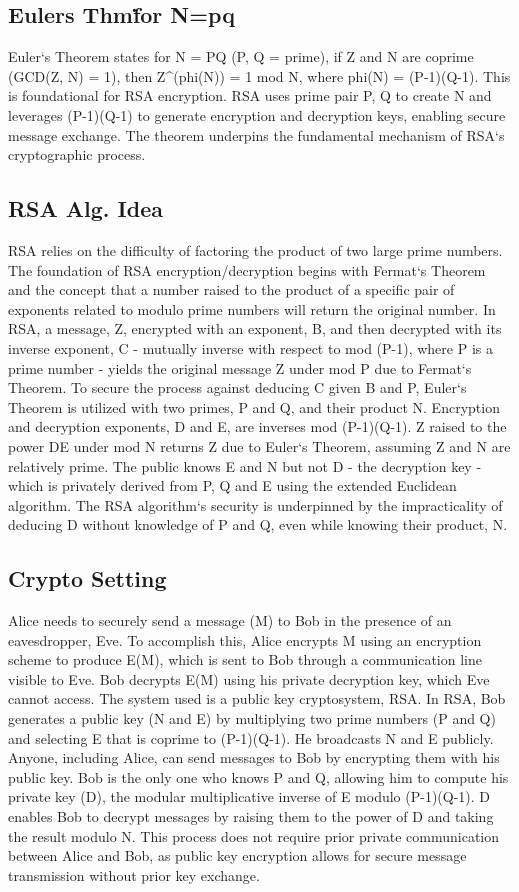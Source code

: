 \subsection*{Eulers Thm\. for N=pq}
Euler`s Theorem states for N = PQ (P, Q = prime), if Z and N are coprime (GCD(Z, N) = 1), then Z\textasciicircum{}(phi(N)) = 1 mod N, where phi(N) = (P-1)(Q-1).
This is foundational for RSA encryption.
RSA uses prime pair P, Q to create N and leverages (P-1)(Q-1) to generate encryption and decryption keys, enabling secure message exchange.
The theorem underpins the fundamental mechanism of RSA`s cryptographic process.

\subsection*{RSA Alg.
Idea}
RSA relies on the difficulty of factoring the product of two large prime numbers.
The foundation of RSA encryption/decryption begins with Fermat`s Theorem and the concept that a number raised to the product of a specific pair of exponents related to modulo prime numbers will return the original number.
In RSA, a message, Z, encrypted with an exponent, B, and then decrypted with its inverse exponent, C - mutually inverse with respect to mod (P-1), where P is a prime number - yields the original message Z under mod P due to Fermat`s Theorem.
To secure the process against deducing C given B and P, Euler`s Theorem is utilized with two primes, P and Q, and their product N\@.
Encryption and decryption exponents, D and E, are inverses mod (P-1)(Q-1).
Z raised to the power DE under mod N returns Z due to Euler`s Theorem, assuming Z and N are relatively prime.
The public knows E and N but not D - the decryption key - which is privately derived from P, Q and E using the extended Euclidean algorithm.
The RSA algorithm`s security is underpinned by the impracticality of deducing D without knowledge of P and Q, even while knowing their product, N\@.

\subsection*{Crypto Setting}
Alice needs to securely send a message (M) to Bob in the presence of an eavesdropper, Eve.
To accomplish this, Alice encrypts M using an encryption scheme to produce E(M), which is sent to Bob through a communication line visible to Eve.
Bob decrypts E(M) using his private decryption key, which Eve cannot access.
The system used is a public key cryptosystem, RSA\@.
In RSA, Bob generates a public key (N and E) by multiplying two prime numbers (P and Q) and selecting E that is coprime to (P-1)(Q-1).
He broadcasts N and E publicly.
Anyone, including Alice, can send messages to Bob by encrypting them with his public key.
Bob is the only one who knows P and Q, allowing him to compute his private key (D), the modular multiplicative inverse of E modulo (P-1)(Q-1).
D enables Bob to decrypt messages by raising them to the power of D and taking the result modulo N\@.
This process does not require prior private communication between Alice and Bob, as public key encryption allows for secure message transmission without prior key exchange.

